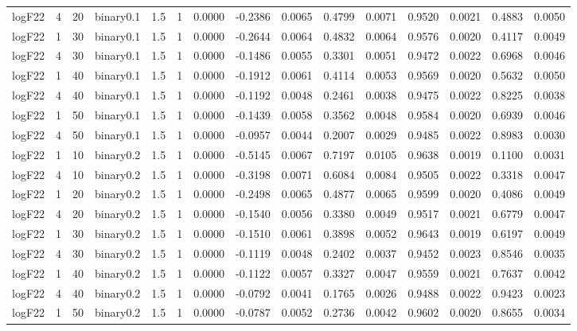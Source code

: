 \begin{longtable}{rrrrrrrrrrrrrrr}
  logF22 & 4 & 20 & binary0.1 & 1.5 & 1 & 0.0000 & -0.2386 & 0.0065 & 0.4799 & 0.0071 & 0.9520 & 0.0021 & 0.4883 & 0.0050 \\ 
  logF22 & 1 & 30 & binary0.1 & 1.5 & 1 & 0.0000 & -0.2644 & 0.0064 & 0.4832 & 0.0064 & 0.9576 & 0.0020 & 0.4117 & 0.0049 \\ 
  logF22 & 4 & 30 & binary0.1 & 1.5 & 1 & 0.0000 & -0.1486 & 0.0055 & 0.3301 & 0.0051 & 0.9472 & 0.0022 & 0.6968 & 0.0046 \\ 
  logF22 & 1 & 40 & binary0.1 & 1.5 & 1 & 0.0000 & -0.1912 & 0.0061 & 0.4114 & 0.0053 & 0.9569 & 0.0020 & 0.5632 & 0.0050 \\ 
  logF22 & 4 & 40 & binary0.1 & 1.5 & 1 & 0.0000 & -0.1192 & 0.0048 & 0.2461 & 0.0038 & 0.9475 & 0.0022 & 0.8225 & 0.0038 \\ 
  logF22 & 1 & 50 & binary0.1 & 1.5 & 1 & 0.0000 & -0.1439 & 0.0058 & 0.3562 & 0.0048 & 0.9584 & 0.0020 & 0.6939 & 0.0046 \\ 
  logF22 & 4 & 50 & binary0.1 & 1.5 & 1 & 0.0000 & -0.0957 & 0.0044 & 0.2007 & 0.0029 & 0.9485 & 0.0022 & 0.8983 & 0.0030 \\ 
  logF22 & 1 & 10 & binary0.2 & 1.5 & 1 & 0.0000 & -0.5145 & 0.0067 & 0.7197 & 0.0105 & 0.9638 & 0.0019 & 0.1100 & 0.0031 \\ 
  logF22 & 4 & 10 & binary0.2 & 1.5 & 1 & 0.0000 & -0.3198 & 0.0071 & 0.6084 & 0.0084 & 0.9505 & 0.0022 & 0.3318 & 0.0047 \\ 
  logF22 & 1 & 20 & binary0.2 & 1.5 & 1 & 0.0000 & -0.2498 & 0.0065 & 0.4877 & 0.0065 & 0.9599 & 0.0020 & 0.4086 & 0.0049 \\ 
  logF22 & 4 & 20 & binary0.2 & 1.5 & 1 & 0.0000 & -0.1540 & 0.0056 & 0.3380 & 0.0049 & 0.9517 & 0.0021 & 0.6779 & 0.0047 \\ 
  logF22 & 1 & 30 & binary0.2 & 1.5 & 1 & 0.0000 & -0.1510 & 0.0061 & 0.3898 & 0.0052 & 0.9643 & 0.0019 & 0.6197 & 0.0049 \\ 
  logF22 & 4 & 30 & binary0.2 & 1.5 & 1 & 0.0000 & -0.1119 & 0.0048 & 0.2402 & 0.0037 & 0.9452 & 0.0023 & 0.8546 & 0.0035 \\ 
  logF22 & 1 & 40 & binary0.2 & 1.5 & 1 & 0.0000 & -0.1122 & 0.0057 & 0.3327 & 0.0047 & 0.9559 & 0.0021 & 0.7637 & 0.0042 \\ 
  logF22 & 4 & 40 & binary0.2 & 1.5 & 1 & 0.0000 & -0.0792 & 0.0041 & 0.1765 & 0.0026 & 0.9488 & 0.0022 & 0.9423 & 0.0023 \\ 
  logF22 & 1 & 50 & binary0.2 & 1.5 & 1 & 0.0000 & -0.0787 & 0.0052 & 0.2736 & 0.0042 & 0.9602 & 0.0020 & 0.8655 & 0.0034 \\ 

\end{longtable}

